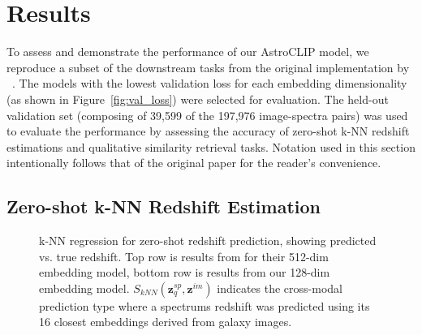 
\section{Results}\label{sec:results}
To assess and demonstrate the performance of our AstroCLIP model, we reproduce a subset of the downstream tasks from
the original implementation by ~\cite{astroclip}.
The models with the lowest validation loss for each embedding dimensionality (as shown in Figure~\eqref{fig:val_loss})
were selected for evaluation.
The held-out validation set (composing of 39,599 of the 197,976 image-spectra pairs) was used to evaluate the performance
by assessing the accuracy of zero-shot k-NN redshift estimations and qualitative similarity retrieval tasks.
Notation used in this section intentionally follows that of the original paper for the reader's convenience.

\subsection{Zero-shot k-NN Redshift Estimation}\label{subsec:results-redshift-regression}

\begin{figure}[t]
    \centering
    \caption{k-NN regression for zero-shot redshift prediction, showing predicted vs. true redshift.
    Top row is results from \cite{astroclip} for their 512-dim embedding model, bottom row is results from our 128-dim embedding
    model.
    $S_{kNN}(\mathbf{z}_{q}^{sp}, \mathbf{z}^{im})$ indicates the cross-modal prediction type where a spectrums redshift was
    predicted using its 16 closest embeddings derived from galaxy images.}
    \label{fig:rkr}
\end{figure}

